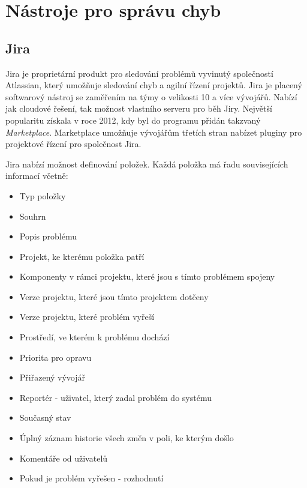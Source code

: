 \documentclass[czech,DP]{thesiskiv}
\begin{document}

\chapter{Nástroje pro správu chyb}
\section{Jira}
Jira je proprietární produkt pro sledování problémů vyvinutý společností Atlassian\citep{jirabugtracking}, který umožňuje sledování chyb a agilní řízení projektů. Jira je placený softwarový nástroj se zaměřením na týmy o velikosti 10 a více vývojářů. Nabízí jak cloudové řešení, tak možnost vlastního serveru pro běh Jiry. Největší popularitu získala v roce 2012, kdy byl do programu přidán takzvaný \textit{Marketplace}. Marketplace umožňuje vývojářům třetích stran nabízet pluginy pro projektové řízení pro společnost Jira. 

Jira nabízí možnost definování položek. Každá položka má řadu souvisejících informací včetně:

\begin{itemize}
\item Typ položky
\item Souhrn
\item Popis problému
\item Projekt, ke kterému položka patří
\item Komponenty v rámci projektu, které jsou s tímto problémem spojeny
\item Verze projektu, které jsou tímto projektem dotčeny
\item Verze projektu, které problém vyřeší
\item Prostředí, ve kterém k problému dochází
\item Priorita pro opravu
\item Přiřazený vývojář
\item Reportér - uživatel, který zadal problém do systému
\item Současný stav
\item Úplný záznam historie všech změn v poli, ke kterým došlo
\item Komentáře od uživatelů
\item Pokud je problém vyřešen - rozhodnutí
\end{itemize}
\end{document}
